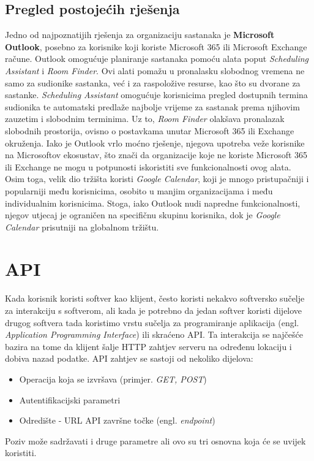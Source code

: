 \documentclass{foi}
\begin{document}
\section{Pregled postojećih rješenja}

Jedno od najpoznatijih rješenja za organizaciju sastanaka je \textbf{Microsoft Outlook}, posebno za korisnike koji koriste Microsoft 365 ili Microsoft Exchange račune. Outlook omogućuje planiranje sastanaka pomoću alata poput \textit{Scheduling Assistant} i \textit{Room Finder}. Ovi alati pomažu u pronalasku slobodnog vremena ne samo za sudionike sastanka, već i za raspoložive resurse, kao što su dvorane za sastanke.
\textit{Scheduling Assistant} omogućuje korisnicima pregled dostupnih termina sudionika te automatski predlaže najbolje vrijeme za sastanak prema njihovim zauzetim i slobodnim terminima. Uz to, \textit{Room Finder} olakšava pronalazak slobodnih prostorija, ovisno o postavkama unutar Microsoft 365 ili Exchange okruženja.
Iako je Outlook vrlo moćno rješenje, njegova upotreba veže korisnike na Microsoftov ekosustav, što znači da organizacije koje ne koriste Microsoft 365 ili Exchange ne mogu u potpunosti iskoristiti sve funkcionalnosti ovog alata. Osim toga, velik dio tržišta koristi \textit{Google Calendar}, koji je mnogo pristupačniji i popularniji među korisnicima, osobito u manjim organizacijama i među individualnim korisnicima. Stoga, iako Outlook nudi napredne funkcionalnosti, njegov utjecaj je ograničen na specifičnu skupinu korisnika, dok je \textit{Google Calendar} prisutniji na globalnom tržištu.


\chapter{API}
Kada korisnik koristi softver kao klijent, često koristi nekakvo softversko sučelje za interakciju s softverom, ali kada je potrebno da jedan softver koristi dijelove drugog softvera tada koristimo vrstu sučelja za programiranje aplikacija (engl. \textit{Application Programming Interface}) ili skraćeno API.\cite{biehl2015api}
Ta interakcija se najčešće bazira na tome da klijent šalje HTTP zahtjev serveru na određenu lokaciju i dobiva nazad podatke.
API zahtjev se sastoji od nekoliko dijelova:
\begin{itemize}
    \item Operacija koja se izvršava (primjer. \textit{GET, POST})
    \item Autentifikacijski parametri
    \item Odredište - URL API završne točke (engl. \textit{endpoint})
\end{itemize}
Poziv može sadržavati i druge parametre ali ovo su tri osnovna koja će se uvijek koristiti.\cite{altexsoft}
\end{document}
